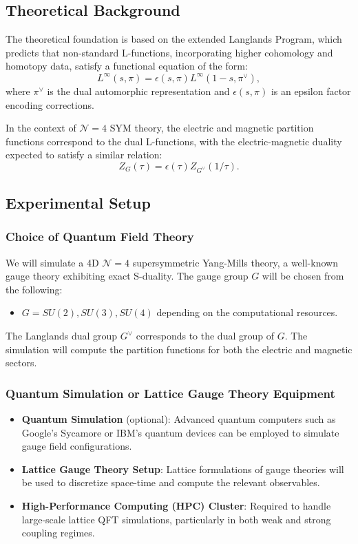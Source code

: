 \documentclass{article}
\theoremstyle{remark}
\begin{document}
\subsection{Theoretical Background}
The theoretical foundation is based on the extended Langlands Program, which predicts that non-standard L-functions, incorporating higher cohomology and homotopy data, satisfy a functional equation of the form:
\begin{equation}
L^{\infty}(s, \pi) = \epsilon(s, \pi) L^{\infty}(1 - s, \pi^\vee),
\end{equation}
where $ \pi^\vee $ is the dual automorphic representation and $ \epsilon(s, \pi) $ is an epsilon factor encoding corrections.

In the context of $ \mathcal{N}=4 $ SYM theory, the electric and magnetic partition functions correspond to the dual L-functions, with the electric-magnetic duality expected to satisfy a similar relation:
\begin{equation}
Z_G(\tau) = \epsilon(\tau) Z_{G^\vee}(1/\tau).
\end{equation}

\subsection{Experimental Setup}

\subsubsection{Choice of Quantum Field Theory}
We will simulate a 4D $ \mathcal{N}=4 $ supersymmetric Yang-Mills theory, a well-known gauge theory exhibiting exact S-duality. The gauge group $ G $ will be chosen from the following:
\begin{itemize}
    \item $ G = SU(2), SU(3), SU(4) $ depending on the computational resources.
\end{itemize}
The Langlands dual group $ G^\vee $ corresponds to the dual group of $ G $. The simulation will compute the partition functions for both the electric and magnetic sectors.

\subsubsection{Quantum Simulation or Lattice Gauge Theory Equipment}
\begin{itemize}
    \item \textbf{Quantum Simulation} (optional): Advanced quantum computers such as Google's Sycamore or IBM's quantum devices can be employed to simulate gauge field configurations.
    \item \textbf{Lattice Gauge Theory Setup}: Lattice formulations of gauge theories will be used to discretize space-time and compute the relevant observables.
    \item \textbf{High-Performance Computing (HPC) Cluster}: Required to handle large-scale lattice QFT simulations, particularly in both weak and strong coupling regimes.
\end{itemize}
\end{document}
